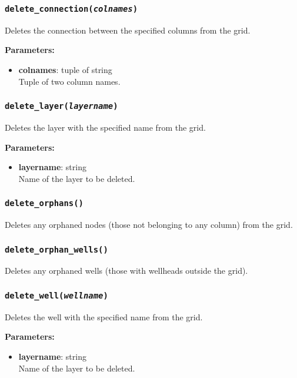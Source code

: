 \subsubsection{\texttt{delete\_connection(\emph{colnames})}}

Deletes the connection between the specified columns from the grid.

\textbf{Parameters:}
\begin{itemize}
\item \textbf{colnames}: tuple of string\\
  Tuple of two column names.
\end{itemize}

\subsubsection{\texttt{delete\_layer(\emph{layername})}}

Deletes the layer with the specified name from the grid.

\textbf{Parameters:}
\begin{itemize}
\item \textbf{layername}: string\\
  Name of the layer to be deleted.
\end{itemize}

\subsubsection{\texttt{delete\_orphans()}}

Deletes any orphaned nodes (those not belonging to any column) from the grid.

\subsubsection{\texttt{delete\_orphan\_wells()}}

Deletes any orphaned wells (those with wellheads outside the grid).

\subsubsection{\texttt{delete\_well(\emph{wellname})}}

Deletes the well with the specified name from the grid.

\textbf{Parameters:}
\begin{itemize}
\item \textbf{layername}: string\\
  Name of the layer to be deleted.
\end{itemize}

